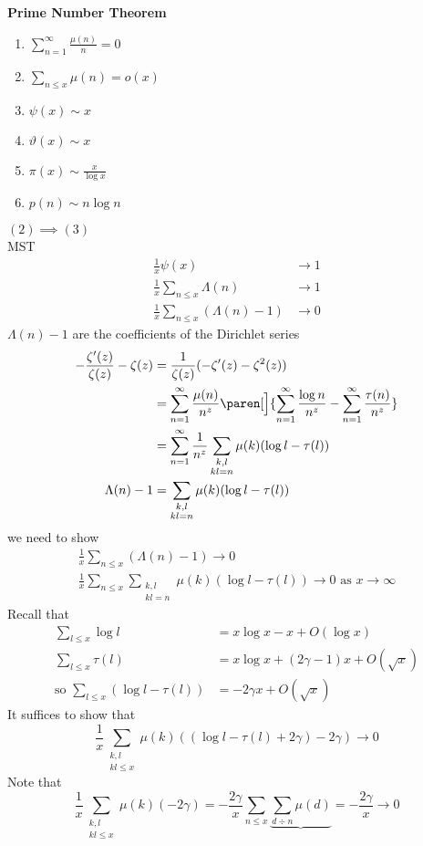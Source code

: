\textbf{Prime Number Theorem}
\begin{enumerate}
\item $\sum_{n=1}^\infty\frac{\mu(n)}{n}=0$
\item $\sum_{n\leq x}\mu(n)=o(x)$
\item $\psi(x)\sim x$
\item $\vartheta(x)\sim x$
\item $\pi(x)\sim\frac{x}{\log x}$
\item $p(n)\sim n\log n$
\end{enumerate}
\textbf{$(2)\implies(3)$} \\
MST
\begin{align*}
\frac1x\psi(x) &\to 1 \\
\frac1x\sum_{n\leq x}\Lambda(n) &\to 1 \\
\frac1x\sum_{n\leq x}(\Lambda(n)-1) &\to 0
\end{align*}
$\Lambda(n)-1$ are the coefficients of the Dirichlet series
\begin{align*}
-\frac{\zeta'(z)}{\zeta(z)} - \zeta(z) &= \frac1{\zeta(z)}(-\zeta'(z)-\zeta^2(z)) \\
&= \sum_{n=1}^\infty \frac{\mu(n)}{n^z} \paren[\Big]{\sum_{n=1}^\infty\frac{\log n}{n^z} - \sum_{n=1}^\infty\frac{\tau(n)}{n^z}} \\
&= \sum_{n=1}^\infty \frac1{n^z}\sum_{\substack{k,l\\kl=n}}\mu(k)(\log l - \tau(l)) \\
\Lambda(n)-1 &= \sum_{\substack{k,l\\kl=n}}\mu(k)(\log l - \tau(l))
\end{align*}
we need to show
\begin{gather*}
\frac1x \sum_{n\leq x}(\Lambda(n)-1) \to 0 \\
\frac1x \sum_{n\leq x}\sum_{\substack{k,l\\kl=n}} \mu(k) (\log l-\tau(l)) \to 0 \text{ as } x\to\infty
\end{gather*}
Recall that
\begin{align*}
\sum_{l\leq x}\log l &= x\log x - x + O(\log x) \\
\sum_{l\leq x}\tau(l) &= x\log x + (2\gamma-1)x + O(\sqrt x) \\
\text{so } \sum_{l\leq x}(\log l-\tau(l)) &= -2\gamma x + O(\sqrt x)
\end{align*}
It suffices to show that
\[ \frac1x\sum_{\substack{k,l\\kl\leq x}}\mu(k)((\log l-\tau(l)+2\gamma)-2\gamma) \to 0 \]
Note that
\[ \frac1x\sum_{\substack{k,l\\kl\leq x}}\mu(k)(-2\gamma) = -\frac{2\gamma}{x}\sum_{n\leq x}\underbrace{\sum_{d\div n}\mu(d)} = -\frac{2\gamma}{x} \to 0 \]
